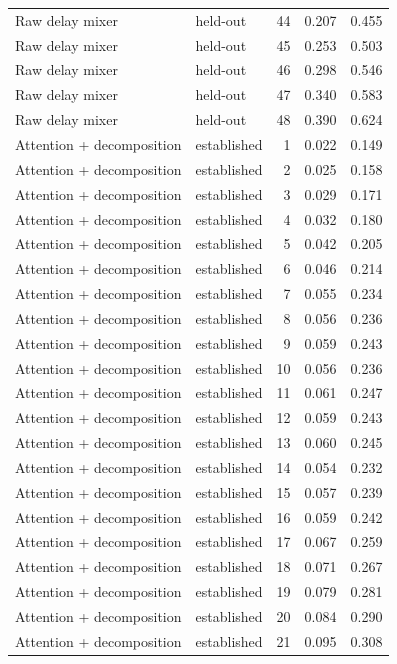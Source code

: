 \begin{tabular}{llrrr}
Raw delay mixer & held-out & 44 & 0.207 & 0.455 \\
Raw delay mixer & held-out & 45 & 0.253 & 0.503 \\
Raw delay mixer & held-out & 46 & 0.298 & 0.546 \\
Raw delay mixer & held-out & 47 & 0.340 & 0.583 \\
Raw delay mixer & held-out & 48 & 0.390 & 0.624 \\
Attention + decomposition & established & 1 & 0.022 & 0.149 \\
Attention + decomposition & established & 2 & 0.025 & 0.158 \\
Attention + decomposition & established & 3 & 0.029 & 0.171 \\
Attention + decomposition & established & 4 & 0.032 & 0.180 \\
Attention + decomposition & established & 5 & 0.042 & 0.205 \\
Attention + decomposition & established & 6 & 0.046 & 0.214 \\
Attention + decomposition & established & 7 & 0.055 & 0.234 \\
Attention + decomposition & established & 8 & 0.056 & 0.236 \\
Attention + decomposition & established & 9 & 0.059 & 0.243 \\
Attention + decomposition & established & 10 & 0.056 & 0.236 \\
Attention + decomposition & established & 11 & 0.061 & 0.247 \\
Attention + decomposition & established & 12 & 0.059 & 0.243 \\
Attention + decomposition & established & 13 & 0.060 & 0.245 \\
Attention + decomposition & established & 14 & 0.054 & 0.232 \\
Attention + decomposition & established & 15 & 0.057 & 0.239 \\
Attention + decomposition & established & 16 & 0.059 & 0.242 \\
Attention + decomposition & established & 17 & 0.067 & 0.259 \\
Attention + decomposition & established & 18 & 0.071 & 0.267 \\
Attention + decomposition & established & 19 & 0.079 & 0.281 \\
Attention + decomposition & established & 20 & 0.084 & 0.290 \\
Attention + decomposition & established & 21 & 0.095 & 0.308 \\

\end{tabular}

